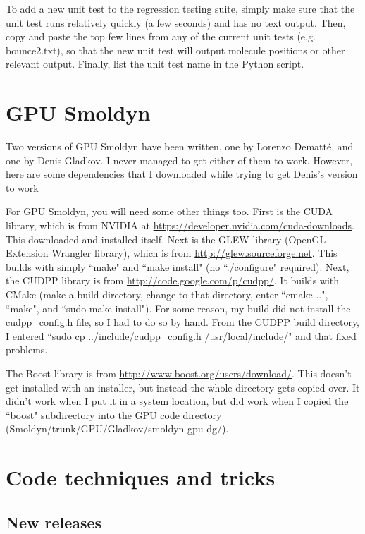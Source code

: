 \documentclass {scrbook}
\begin{document}
To add a new unit test to the regression testing suite, simply make sure that the unit test runs relatively quickly (a few seconds) and has no text output. Then, copy and paste the top few lines from any of the current unit tests (e.g. bounce2.txt), so that the new unit test will output molecule positions or other relevant output. Finally, list the unit test name in the Python script.


\section{GPU Smoldyn}

Two versions of GPU Smoldyn have been written, one by Lorenzo Dematt\'{e}, and one by Denis Gladkov. I never managed to get either of them to work. However, here are some dependencies that I downloaded while trying to get Denis's version to work

For GPU Smoldyn, you will need some other things too. First is the CUDA library, which is from NVIDIA at \url{https://developer.nvidia.com/cuda-downloads}. This downloaded and installed itself. Next is the GLEW library (OpenGL Extension Wrangler library), which is from \url{http://glew.sourceforge.net}. This builds with simply ``make" and ``make install" (no ``./configure" required). Next, the CUDPP library is from \url{http://code.google.com/p/cudpp/}. It builds with CMake (make a build directory, change to that directory, enter ``cmake ..", ``make", and ``sudo make install"). For some reason, my build did not install the cudpp\_config.h file, so I had to do so by hand. From the CUDPP build directory, I entered ``sudo cp ../include/cudpp\_config.h /usr/local/include/" and that fixed problems.

The Boost library is from \url{http://www.boost.org/users/download/}. This doesn't get installed with an installer, but instead the whole directory gets copied over. It didn't work when I put it in a system location, but did work when I copied the ``boost" subdirectory into the GPU code directory (Smoldyn/trunk/GPU/Gladkov/smoldyn-gpu-dg/).



\section{Code techniques and tricks}

\subsection{New releases}
\end{document}
